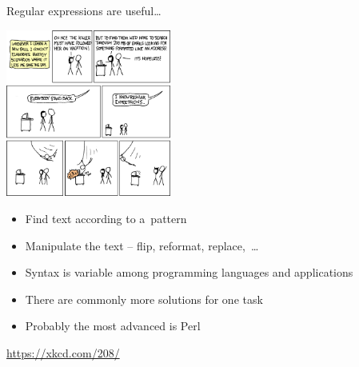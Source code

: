 \documentclass[compress, ucs, xelatex, 11pt, xcolor=svgnames,
  hyperref={
    bookmarks=true,
    unicode=true,
    colorlinks=true,
    pdftitle={Linux, command line and MetaCentrum},
    plainpages=false,
    pdfauthor={Vojtech Zeisek},
    pdfsubject={Course about use of Linux command line, writing shell scripts and using MetaCentrum of CESNET},
    pdfcreator={XeLaTeX},
    pdfkeywords={Linux, GNU, BASH, shell, command line, MetaCentrum},
    linkcolor=DarkRed,
    anchorcolor=DarkBlue,
    citecolor=Indigo,
    filecolor=NavyBlue,
    menucolor=DarkMagenta,
    urlcolor=DarkBlue,
    pdftex},
  url={hyphens, lowtilde} %
  ]{beamer}
\begin{document}
\begin{frame}{Regular expressions are useful\ldots}
  \begin{multicols}{2}
    \begin{center}
      \includegraphics[height=5.5cm]{regular_expressions.png}
    \end{center}
    \columnbreak
    \begin{itemize}
      \item Find text according to a~pattern
      \item Manipulate the text -- flip, reformat, replace,~\ldots
      \item Syntax is variable among programming languages and applications
      \item There are commonly more solutions for one task
      \item Probably the most advanced is Perl
    \end{itemize}
    \vfill
    \url{https://xkcd.com/208/}
  \end{multicols}
\end{frame}
\end{document}
